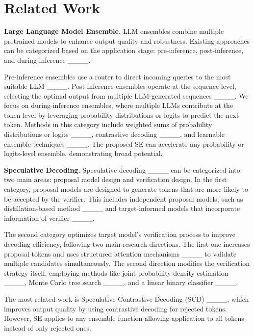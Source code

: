 \section{Related Work}
\noindent\textbf{Large Language Model Ensemble.}
LLM ensembles combine multiple pretrained models to enhance output quality and robustness. Existing approaches can be categorized based on the application stage: pre-inference, post-inference, and during-inference ____. 

Pre-inference ensembles use a router to direct incoming queries to the most suitable LLM ____. Post-inference ensembles operate at the sequence level, selecting the optimal output from multiple LLM-generated sequences ____. We focus on during-inference ensembles, where multiple LLMs contribute at the token level by leveraging probability distributions or logits to predict the next token. Methods in this category include weighted sums of probability distributions or logits ____, contrastive decoding ____, and learnable ensemble techniques ____. The proposed SE can accelerate any probability or logits-level ensemble, demonstrating broad potential.


\noindent\textbf{Speculative Decoding.}
Speculative decoding ____ can be categorized into two main areas: proposal model design and verification design. In the first category, proposal models are designed to generate tokens that are more likely to be accepted by the verifier. This includes independent proposal models, such as distillation-based method ____ and target-informed models that incorporate information of verifier ____.

The second category optimizes target model's verification process to improve decoding efficiency, following two main research directions. The first one increases proposal tokens and uses structured attention mechanisms ____ to validate multiple candidates simultaneously. The second direction modifies the verification strategy itself, employing methods like joint probability density estimation ____, Monte Carlo tree search ____, and a linear binary classifier ____.

The most related work is Speculative Contrastive Decoding (SCD) ____, which improves output quality by using contrastive decoding for rejected tokens. However, SE applies to any ensemble function allowing application to all tokens instead of only rejected ones.

